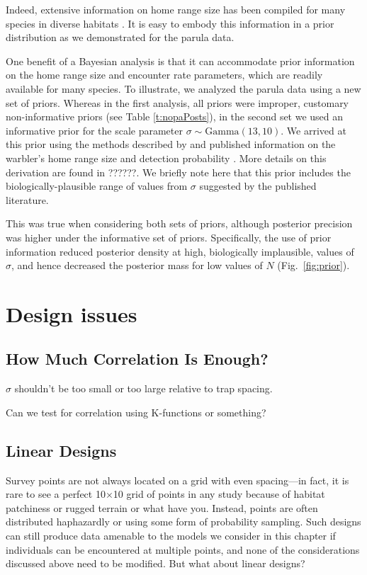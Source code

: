 Indeed, extensive information on home range size has
been compiled for many species in diverse habitats %
\citep[\emph{e.g.},][]{degraaf_yamasaki:2001}. It is
easy to embody this information in a prior distribution as we
demonstrated for the parula data.


One benefit of a Bayesian analysis is that it can accommodate prior
information on the home range size and encounter rate parameters,
which are readily available for many
species. To illustrate, we analyzed the parula data using a new set of
priors. Whereas in the first analysis, all priors were
improper, customary non-informative priors (see Table \ref{t:nopaPosts}),
in the second set we used
an informative prior for the scale parameter $\sigma \sim
\mbox{Gamma}(13,10)$. We arrived at this prior using the methods
described by \citet{royle_etal:2011mee} and published
information on the warbler's home range size and detection probability
\citep{moldenhaer_regelski:1996,simons_etal:2009}. More details on this
derivation are found in ??????. We briefly note here that this prior
includes the biologically-plausible range of values from $\sigma$
suggested by the published literature.


This was true when considering
both sets of priors, although posterior precision was higher under the
informative set of priors. Specifically, the use of prior information
reduced posterior density at high, biologically implausible,
values of $\sigma$, and hence decreased the posterior mass for
low values of $N$ (Fig.~\ref{fig:prior}).


\section{Design issues}

\subsection{How Much Correlation Is Enough?}

$\sigma$ shouldn't be too small or too large relative to trap spacing.

Can we test for correlation using K-functions or something?

\subsection{Linear Designs}

Survey points are not always located on a grid with even spacing---in
fact, it is rare to see a perfect 10$\times$10 grid of points in any
study because of habitat patchiness or rugged terrain or what have
you. Instead, points are often distributed haphazardly or using some form of
probability sampling. Such designs can still produce data amenable to
the models we consider in this chapter if individuals can be
encountered at multiple points, and none of the considerations
discussed above need to be modified. But what about linear designs?

